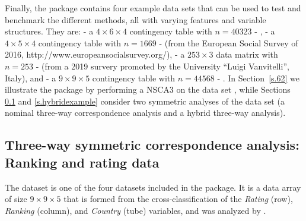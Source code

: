 Finally, the package contains four example data sets that can be used to test and benchmark the different methods, all with varying features and variable structures. They are:  - a $4\times6\times4$ contingency table with $n = 40323$ -  \cite[]{dav77},  - a $4\times 5 \times 4$ contingency table with $n = 1669$ - (from the European Social Survey of 2016, http://www.europeansocialsurvey.org/),  - a $253\times 3$ data matrix with $n = 253$ - (from a 2019 survery promoted by the University  ``Luigi Vanvitelli'', Italy), and   - a $9\times 9\times 5$ contingency table with $n = 44568$ - \cite[]{vel07}. In Section~\ref{s.62} we illustrate the package by performing a NSCA3 on the data set , while Sections \ref{s.nominalexample} and \ref{s.hybridexample} consider two symmetric analyses of the  data set (a nominal three-way correspondence analysis and a hybrid three-way analysis).


\subsection{Three-way symmetric correspondence analysis: Ranking and rating data}
\label{s.nominalexample}

The dataset  is one of the four datasets included in the  package. It is a data array of size $9\times 9 \times 5$ that is formed from the cross-classification of the {\it Rating} (row), {\it Ranking} (column), and {\it Country} (tube) variables, and was analyzed by \cite{vel07}. 


